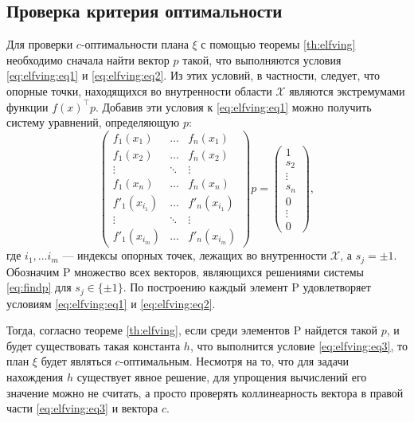\documentclass[specialist,
               substylefile = spbu.rtx,
               subf,href,colorlinks=true, 12pt]{disser}
\theoremstyle{definition}
\begin{document}
	\subsection{Проверка критерия оптимальности}
	Для проверки $c$-оптимальности плана $\xi$ с помощью теоремы \ref{th:elfving} необходимо сначала найти вектор $p$  такой, что выполняются условия \eqref{eq:elfving:eq1} и \eqref{eq:elfving:eq2}. Из этих условий, в частности, следует, что опорные точки, находящихся во внутренности области $\mathcal{X}$ являются экстремумами функции $f(x)^\top p$. Добавив эти условия к \eqref{eq:elfving:eq1} можно получить систему уравнений, определяющую $p$:
	 \begin{equation}
	 \label{eq:findp}
		\begin{pmatrix}
			f_1(x_1) & \dots & f_n(x_1) \\
			f_1(x_2) & \dots & f_n(x_2) \\
  			\vdots &   \ddots & \vdots \\
  			f_1(x_n)  & \dots & f_n(x_n) \\
  			f'_1(x_{i_1}) & \dots & f'_n(x_{i_1}) \\
  			\vdots &   \ddots & \vdots \\
  			f'_1(x_{i_m})  & \dots & f'_n(x_{i_m})
		\end{pmatrix} 
		p =
		\begin{pmatrix}
			1 \\ s_2 \\ \vdots \\ s_n \\ 0 \\ \vdots \\ 0
		\end{pmatrix},
	\end{equation}
	где $i_1, \ldots i_m$ --- индексы опорных точек, лежащих во внутренности $\mathcal{X}$, а $s_j = \pm 1$.  Обозначим $\mathrm{P}$ множество всех векторов, являющихся решениями системы \eqref{eq:findp} для $s_j \in \{\pm 1\}$. По построению каждый элемент $\mathrm{P}$ удовлетворяет условиям \eqref{eq:elfving:eq1} и \eqref{eq:elfving:eq2}.
	
	Тогда, согласно теореме \ref{th:elfving}, если среди элементов $\mathrm{P}$ найдется такой $p$, и будет существовать такая константа $h$, что выполнится условие \eqref{eq:elfving:eq3}, то план $\xi$ будет являться $c$-оптимальным. Несмотря на то, что для задачи  нахождения $h$ существует явное решение, для упрощения вычислений его значение можно не считать, а просто проверять коллинеарность вектора в правой части \eqref{eq:elfving:eq3} и вектора $c$. 
	
\end{document}
